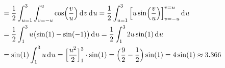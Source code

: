 \documentclass[../full]{subfiles}
\begin{document}
\begin{gather*}
\begin{aligned}
            \\ &
            = \frac{1}{2} \int_{u = 1}^3
                \int_{v = -u}^u \cos \paren[\Big]{\frac{v}{u}} \dx[v]
            \dx[u]
            = \frac{1}{2} \int_{u = 1}^3
                \FunctionBounds{u \sin \paren[\Big]{\frac{v}{u}}}[v]{-u}{u}
            \dx[u]
            \\ &
            = \frac{1}{2} \int_1^3
                u \paren[\big]{\sin \paren{1} - \sin \paren{-1}}
            \dx[u]
            = \frac{1}{2} \int_1^3 2u \sin \paren{1} \dx[u]
            \\ &
            = \sin \paren{1} \int_1^3 u \dx[u]
            = \FunctionBounds{\frac{u^2}{2}}{1}{3} \cdot \sin \paren{1}
            = \paren[\Big]{\frac{9}{2} - \frac{1}{2}} \sin \paren{1}
            = 4 \sin \paren{1}
            \approx 3.366
        \end{aligned}
    \end{gather*}
\end{document}
